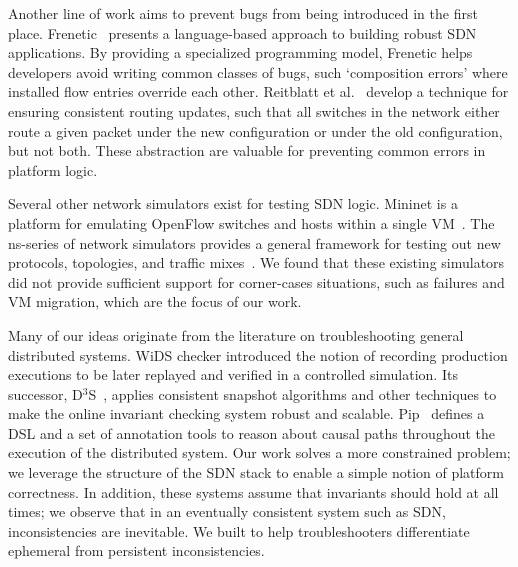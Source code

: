 Another line of work aims to prevent bugs from being introduced in the first
place. Frenetic~\cite{frenetic} presents a language-based approach to building
robust SDN applications. By providing a specialized programming model,
 Frenetic helps developers avoid writing common classes of
bugs, such `composition errors' where installed flow entries override each other.
Reitblatt et al.~\cite{consistentupdates} develop a technique for ensuring
consistent routing updates, such that all switches in the network either route
a given packet under the new configuration or under the old configuration,
but not both. These abstraction are valuable for preventing common errors
in platform logic.

Several other network simulators exist for testing SDN logic. Mininet is a 
platform for emulating OpenFlow switches and hosts within a single
 VM~\cite{Lantz:2010:NLR:1868447.1868466}. The ns-series of network simulators
provides a general framework for testing out new protocols, topologies,
and traffic mixes~\cite{ns3}. We found that these existing simulators did
not provide sufficient support for corner-cases situations, such as failures and
VM migration, which are the focus of our work.


Many of our ideas originate from the literature on troubleshooting general
distributed systems. WiDS checker introduced the notion of recording
production executions to be later replayed and verified in a controlled simulation.
Its successor, D$^3$S~\cite{d3s}, applies consistent snapshot algorithms and
other techniques to make the online invariant checking system robust and
scalable. Pip~\cite{pip} defines a DSL and a set of annotation tools to
reason about causal paths throughout the execution of the
distributed system. Our work solves a more constrained problem; we leverage
the structure of the SDN stack to enable a simple notion of platform
correctness. In addition, these systems assume that invariants should hold at
all times; we observe that in an eventually consistent system such as SDN,
inconsistencies are inevitable. We built \simulator to help troubleshooters
differentiate ephemeral from persistent inconsistencies.


